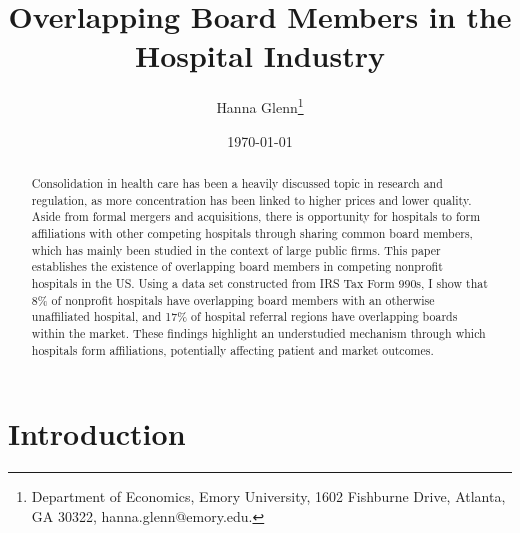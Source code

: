 \documentclass[12pt]{article}
\begin{document}
	
	
	
	
	\linespread{1.2}\title{\vspace{-0.5in} Overlapping Board Members in the Hospital Industry} 
	
	\date{\today}
	
	\author{\vspace{10mm}Hanna Glenn\footnote{Department of Economics, Emory University, 1602 Fishburne Drive, Atlanta, GA 30322, hanna.glenn@emory.edu.} }
	
	\maketitle
	
	\vspace{-0.2in}
	
	\singlespacing\maketitle


 \vspace{3mm}
	
    \begin{abstract}
		{\small
    Consolidation in health care has been a heavily discussed topic in research and regulation, as more concentration has been linked to higher prices and lower quality. Aside from formal mergers and acquisitions, there is opportunity for hospitals to form affiliations with other competing hospitals through sharing common board members, which has mainly been studied in the context of large public firms. This paper establishes the existence of overlapping board members in competing nonprofit hospitals in the US. Using a data set constructed from IRS Tax Form 990s, I show that 8\% of nonprofit hospitals have overlapping board members with an otherwise unaffiliated hospital, and 17\% of hospital referral regions have overlapping boards within the market. These findings highlight an understudied mechanism through which hospitals form affiliations, potentially affecting patient and market outcomes. 
		} 
	\end{abstract}
	
	
	
	
	

	
	\onehalfspacing
	
	\newpage

    \section{Introduction}
\end{document}

